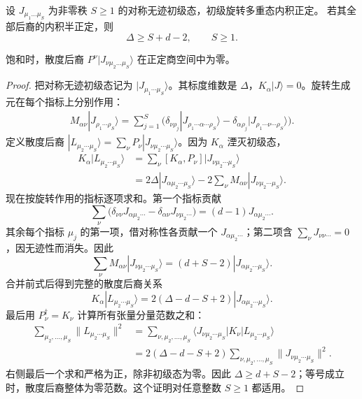 \begin{theorem}[对称无迹自旋的必要幺正性界]
设 $J_{\mu_1\ldots\mu_S}$ 为非零秩 $S\geq1$ 的对称无迹初级态，初级旋转多重态内积正定。
若其全部后裔的内积半正定，则
\begin{equation}\label{eq:ghs-spin-unitarity-bound-extended}
 \Delta\ge S+d-2,\qquad S\ge1.
\end{equation}

饱和时，散度后裔 $P^\nu|J_{\nu\mu_2\ldots\mu_S}\rangle$ 在正定商空间中为零。
\end{theorem}
\begin{proof}
 把对称无迹初级态记为 $|J_{\mu_1\cdots\mu_S}\rangle$。其标度维数是 $\Delta$，$K_\alpha|J\rangle=0$。旋转生成元在每个指标上分别作用：
 \begin{align*}
 M_{\alpha\nu}|J_{\rho_1\cdots\rho_S}\rangle
 =\sum_{j=1}^S\bigl(
 \delta_{\nu\rho_j}|J_{\rho_1\cdots\alpha\cdots\rho_S}\rangle
 -\delta_{\alpha\rho_j}|J_{\rho_1\cdots\nu\cdots\rho_S}\rangle\bigr).
 \end{align*}
 定义散度后裔 $|L_{\mu_2\cdots\mu_S}\rangle
 =\sum_\nu P_\nu|J_{\nu\mu_2\cdots\mu_S}\rangle$。因为 $K_\alpha$ 湮灭初级态，
 \begin{align*}
 K_\alpha|L_{\mu_2\cdots\mu_S}\rangle
 &=\sum_\nu[K_\alpha,P_\nu]
 |J_{\nu\mu_2\cdots\mu_S}\rangle\\
 &=2\Delta|J_{\alpha\mu_2\cdots\mu_S}\rangle
 -2\sum_\nu M_{\alpha\nu}|J_{\nu\mu_2\cdots\mu_S}\rangle.
 \end{align*}
 现在按旋转作用的指标逐项求和。第一个指标贡献
 \begin{equation*}
 \sum_\nu\bigl(\delta_{\nu\nu}J_{\alpha\mu_2\cdots}
 -\delta_{\alpha\nu}J_{\nu\mu_2\cdots}\bigr)
 =(d-1)J_{\alpha\mu_2\cdots}.
 \end{equation*}
 其余每个指标 $\mu_j$ 的第一项，借对称性各贡献一个 $J_{\alpha\mu_2\cdots}$；第二项含 $\sum_\nu J_{\nu\nu\cdots}=0$，因无迹性而消失。因此
 \begin{equation*}
 \sum_\nu M_{\alpha\nu}|J_{\nu\mu_2\cdots\mu_S}\rangle
 =(d+S-2)|J_{\alpha\mu_2\cdots\mu_S}\rangle.
 \end{equation*}
 合并前式后得到完整的散度后裔关系
 \begin{equation*}
 K_\alpha|L_{\mu_2\cdots\mu_S}\rangle
 =2(\Delta-d-S+2)|J_{\alpha\mu_2\cdots\mu_S}\rangle.
 \end{equation*}
 最后用 $P_\nu^\dagger=K_\nu$ 计算所有张量分量范数之和：
 \begin{align*}
 \sum_{\mu_2,\ldots,\mu_S}\|L_{\mu_2\cdots\mu_S}\|^2
 &=\sum_{\nu,\mu_2,\ldots,\mu_S}
 \langle J_{\nu\mu_2\cdots\mu_S}|K_\nu
 |L_{\mu_2\cdots\mu_S}\rangle\\
 &=2(\Delta-d-S+2)
 \sum_{\nu,\mu_2,\ldots,\mu_S}
 \|J_{\nu\mu_2\cdots\mu_S}\|^2.
 \end{align*}
 右侧最后一个求和严格为正，除非初级态为零。因此 $\Delta\ge d+S-2$；等号成立时，散度后裔整体为零范数。这个证明对任意整数 $S\ge1$ 都适用。
\end{proof}

